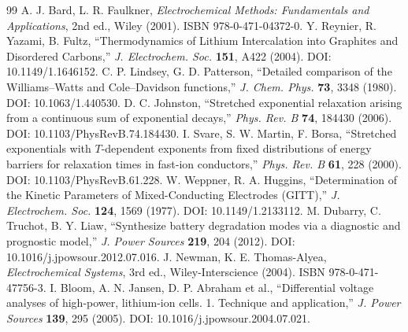 \documentclass[11pt,a4paper]{article}
\begin{document}
\begin{thebibliography}{99}
 A. J. Bard, L. R. Faulkner, \emph{Electrochemical Methods: Fundamentals and Applications}, 2nd ed., Wiley (2001). ISBN 978-0-471-04372-0.
 Y. Reynier, R. Yazami, B. Fultz, ``Thermodynamics of Lithium Intercalation into Graphites and Disordered Carbons,'' \emph{J. Electrochem. Soc.} \textbf{151}, A422 (2004). DOI: 10.1149/1.1646152.
 C. P. Lindsey, G. D. Patterson, ``Detailed comparison of the Williams--Watts and Cole--Davidson functions,'' \emph{J. Chem. Phys.} \textbf{73}, 3348 (1980). DOI: 10.1063/1.440530.
 D. C. Johnston, ``Stretched exponential relaxation arising from a continuous sum of exponential decays,'' \emph{Phys. Rev. B} \textbf{74}, 184430 (2006). DOI: 10.1103/PhysRevB.74.184430.
 I. Svare, S. W. Martin, F. Borsa, ``Stretched exponentials with $T$-dependent exponents from fixed distributions of energy barriers for relaxation times in fast-ion conductors,'' \emph{Phys. Rev. B} \textbf{61}, 228 (2000). DOI: 10.1103/PhysRevB.61.228.
 W. Weppner, R. A. Huggins, ``Determination of the Kinetic Parameters of Mixed-Conducting Electrodes (GITT),'' \emph{J. Electrochem. Soc.} \textbf{124}, 1569 (1977). DOI: 10.1149/1.2133112.
 M. Dubarry, C. Truchot, B. Y. Liaw, ``Synthesize battery degradation modes via a diagnostic and prognostic model,'' \emph{J. Power Sources} \textbf{219}, 204 (2012). DOI: 10.1016/j.jpowsour.2012.07.016.
 J. Newman, K. E. Thomas-Alyea, \emph{Electrochemical Systems}, 3rd ed., Wiley-Interscience (2004). ISBN 978-0-471-47756-3.
 I. Bloom, A. N. Jansen, D. P. Abraham et al., ``Differential voltage analyses of high-power, lithium-ion cells. 1. Technique and application,'' \emph{J. Power Sources} \textbf{139}, 295 (2005). DOI: 10.1016/j.jpowsour.2004.07.021.
\end{thebibliography}
\end{document}

